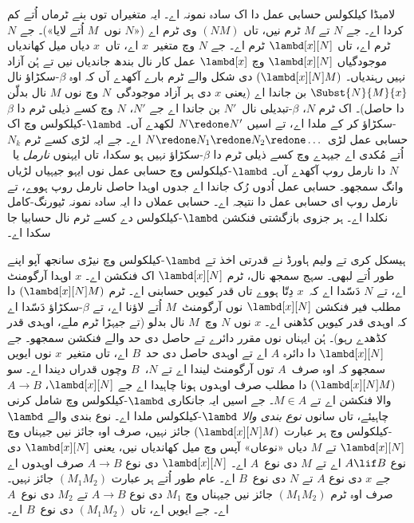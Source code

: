 \documentclass[../../../include/open-logic-section]{subfiles}
\begin{document}


لامبڈا کیلکولس حسابی عمل دا اک سادہ نمونہ اے۔ ایہ متغیراں توں بنے ٹرماں اُتے کم کردا اے۔ جے $N$ تے $M$ ٹرم نیں، تاں $(NM)$ وی ٹرم اے («$N$ نوں~$M$ اُتے لایا»)۔ جے $N$ ٹرم اے، تاں $\lambd[x][N]$ ٹرم اے۔ جے $N$ وچ متغیر~$x$ اے، تاں~$x$ دیاں میل کھاندیاں موجودگیاں $\lambd[x][N]$ وچ $\lambd[x]$ عمل کار نال بندھ جاندیاں نیں تے ہُن آزاد نہیں رہندیاں۔ $(\lambd[x][N]M)$ دی شکل والے ٹرم بارے آکھدے آں کہ اوہ $\beta$-سکڑاؤ نال $\Subst{N}{M}{x}$ بن جاندا اے (یعنی $x$ دی ہر آزاد موجودگی~$N$ وچ نوں $M$ نال بدلّن دا حاصل)۔
اک ٹرم $N$، $\beta$-تبدیلی نال~$N'$ بن جاندا اے جے $N'$، $N$ وچ کسے ذیلی ٹرم دا $\beta$-سکڑاؤ کر کے ملدا اے، تے اسیں $N \redone N'$ لکھدے آں۔ $\lambd$-کیلکولس وچ اک حسابی عمل لڑی $N \redone N_1
\redone N_2 \redone \dots$ اے۔ جے ایہ لڑی کسے ٹرم $N_k$ اُتے مُکدی اے جیہدے وچ کسے ذیلی ٹرم دا $\beta$-سکڑاؤ نہیں ہو سکدا، تاں ایہنوں \emph{نارمل} یا~$N$ دا نارمل روپ آکھدے آں۔ $\lambd$-کیلکولس وچ حسابی عمل نوں ایہو جیہیاں لڑیاں وانگ سمجھو۔ حسابی عمل اُدوں رُک جاندا اے جدوں اوہدا حاصل نارمل روپ ہووے، تے نارمل روپ ای حسابی عمل دا نتیجہ اے۔ حسابی عملاں دا ایہ سادہ نمونہ ٹیورنگ-کامل نکلدا اے۔ ہر جزوی بازگشتی فنکشن $\lambd$-کیلکولس دے کسے ٹرم نال حسابیا جا سکدا اے۔

ہیسکل کری تے ولیم ہاورڈ نے قدرتی اخذ تے $\lambd$-کیلکولس وچ نیڑی سانجھ آپو اپنے طور اُتے لبھی۔
سہج سمجھ نال، ٹرم $\lambd[x][N]$ اک فنکشن اے۔ $x$ اوہدا آرگومنٹ اے، تے $N$ دَسّدا اے کہ~$x$ دِتّا ہووے تاں قدر کیویں حسابنی اے۔ ٹرم $(\lambd[x][N]M)$ دا مطلب فیر فنکشن $\lambd[x][N]$ نوں آرگومنٹ~$M$ اُتے لاؤنا اے، تے $\beta$-سکڑاؤ دَسّدا اے کہ اوہدی قدر کیویں کڈھنی اے۔ $x$ نوں $N$ وچ~$M$ نال بدلو (تے جیہڑا ٹرم ملے، اوہدی قدر کڈھدے رہو)۔
ہُن ایہناں نوں مقرر دائرے تے حاصل دی حد والے فنکشن سمجھو۔ جے $\lambd[x][N]$ دا دائرہ $A$ اے تے اوہدی حاصل دی حد~$B$ اے، تاں متغیر~$x$ نوں ایویں سمجھو کہ اوہ صرف~$A$ توں آرگومنٹ لیندا اے تے $N$،~$B$ وچوں قدراں دیندا اے۔ سو $(\lambd[x][N]M)$ دا مطلب صرف اوہدوں ہونا چاہیدا اے جے $\lambd[x][N]$، $A \to B$ والا فنکشن اے تے $M \in A$۔
جے اسیں ایہ جانکاری $\lambd$-کیلکولس وچ شامل کرنی چاہیئے، تاں سانوں \emph{نوع بندی والا} $\lambd$-کیلکولس ملدا اے۔ نوع بندی والے $\lambd$-کیلکولس وچ ہر عبارت $(\lambd[x][N]M)$ جائز نہیں، صرف اوہ جائز نیں جیہناں وچ $\lambd[x][N]$ تے $M$ دیاں «نوعاں» آپس وچ میل کھاندیاں نیں، یعنی $\lambd[x][N]$ دی نوع $A \lif B$ اے تے $M$ دی نوع~$A$ اے۔ $\lambd[x][N]$ دی نوع $A \to B$ صرف اوہدوں اے جے $x$ دی نوع $A$ تے $N$ دی نوع~$B$ اے۔ عام طور اُتے ہر عبارت $(M_1M_2)$ جائز نہیں۔ صرف اوہ ٹرم $(M_1M_2)$ جائز نیں جیہناں وچ $M_1$ دی نوع $A \to B$ تے $M_2$ دی نوع~$A$ اے۔ جے ایویں اے، تاں $(M_1M_2)$ دی نوع~$B$ اے۔
\end{document}
